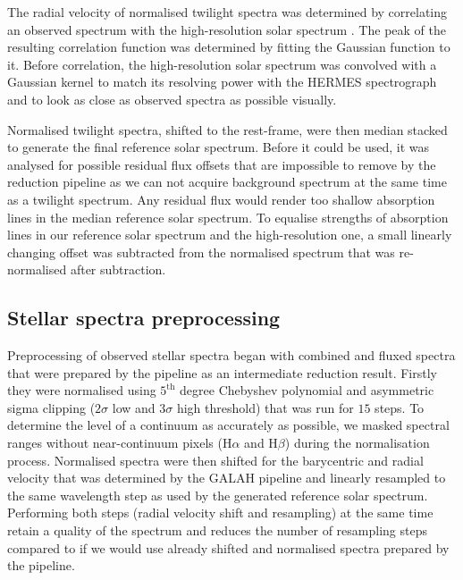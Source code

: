 The radial velocity of normalised twilight spectra was determined by correlating an observed spectrum with the high-resolution solar spectrum \cite{2005MSAIS...8..189K}. The peak of the resulting correlation function was determined by fitting the Gaussian function to it. Before correlation, the high-resolution solar spectrum was convolved with a Gaussian kernel to match its resolving power with the HERMES spectrograph and to look as close as observed spectra as possible visually. 

Normalised twilight spectra, shifted to the rest-frame, were then median stacked to generate the final reference solar spectrum. Before it could be used, it was analysed for possible residual flux offsets that are impossible to remove by the reduction pipeline as we can not acquire background spectrum at the same time as a twilight spectrum. Any residual flux would render too shallow absorption lines in the median reference solar spectrum. To equalise strengths of absorption lines in our reference solar spectrum and the high-resolution one, a small linearly changing offset was subtracted from the normalised spectrum that was re-normalised after subtraction. 

\subsection{Stellar spectra preprocessing}
\label{sec:05_preprocessing}
Preprocessing of observed stellar spectra began with combined and fluxed spectra that were prepared by the pipeline as an intermediate reduction result. Firstly they were normalised using $5^\text{th}$ degree Chebyshev polynomial and asymmetric sigma clipping ($2\sigma$ low and $3\sigma$ high threshold) that was run for $15$ steps. To determine the level of a continuum as accurately as possible, we masked spectral ranges without near-continuum pixels (H$\alpha$ and H$\beta$) during the normalisation process. Normalised spectra were then shifted for the barycentric and radial velocity that was determined by the GALAH pipeline and linearly resampled to the same wavelength step as used by the generated reference solar spectrum. Performing both steps (radial velocity shift and resampling) at the same time retain a quality of the spectrum and reduces the number of resampling steps compared to if we would use already shifted and normalised spectra prepared by the pipeline.

